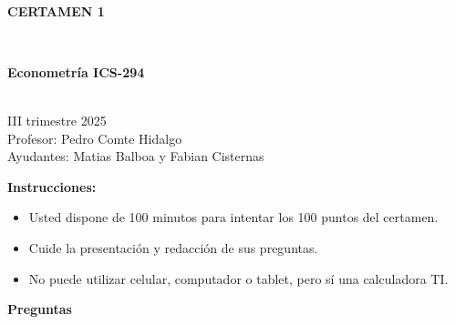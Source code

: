 \documentclass[10pt,a4paper]{article}
\begin{document}
\vspace{5cm}



\begin{center}
\begin{large}
\textbf{\\CERTAMEN 1}
\end{large}\\
\end{center}

\begin{center}
\begin{large}
\textbf{Econometría ICS-294}
\end{large}\\
\vspace{0.2cm}
III trimestre 2025\\
Profesor: Pedro Comte Hidalgo\\
Ayudantes: Matias Balboa y Fabian Cisternas
\end{center}

\textbf{Instrucciones:} 

\begin{itemize}

    \item Usted dispone de 100 minutos  para intentar los 100 puntos del certamen.
    \item Cuide la presentación y redacción de sus preguntas.
    \item No puede utilizar celular, computador o tablet, pero sí una calculadora TI.
     
\end{itemize}

\textbf{Preguntas}
\end{document}
